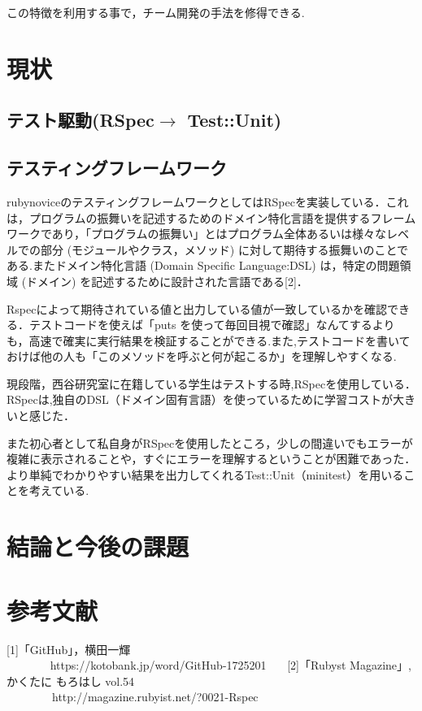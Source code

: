 \documentclass[a4j,twocolumn,uplatex]{jarticle}
\begin{document}
この特徴を利用する事で，チーム開発の手法を修得できる.\\

\section{現状}
\subsection{テスト駆動(RSpec$\rightarrow$ Test::Unit)}
\subsection{テスティングフレームワーク}%
rubynoviceのテスティングフレームワークとしてはRSpecを実装している．これは，プログラムの振舞いを記述するためのドメイン特化言語を提供するフレームワークであり，「プログラムの振舞い」とはプログラム全体あるいは様々なレベルでの部分 (モジュールやクラス，メソッド) に対して期待する振舞いのことである.またドメイン特化言語 (Domain Specific Language:DSL) は，特定の問題領域 (ドメイン) を記述するために設計された言語である[2]．

Rspecによって期待されている値と出力している値が一致しているかを確認できる．テストコードを使えば「puts を使って毎回目視で確認」なんてするよりも，高速で確実に実行結果を検証することができる.また,テストコードを書いておけば他の人も「このメソッドを呼ぶと何が起こるか」を理解しやすくなる.

現段階，西谷研究室に在籍している学生はテストする時,RSpecを使用している．RSpecは,独自のDSL（ドメイン固有言語）を使っているために学習コストが大きいと感じた．

また初心者として私自身がRSpecを使用したところ，少しの間違いでもエラーが複雑に表示されることや，すぐにエラーを理解するということが困難であった．より単純でわかりやすい結果を出力してくれるTest::Unit（minitest）を用いることを考えている.

\section{結論と今後の課題}


\section{参考文献}
[1]「GitHub」，横田一輝\\ ~~~~~~~ https://kotobank.jp/word/GitHub-1725201
\newline ~~~[2]「Rubyst Magazine」, かくたに もろはし vol.54\\~~~~~~~~http://magazine.rubyist.net/?0021-Rspec
\end{document}
